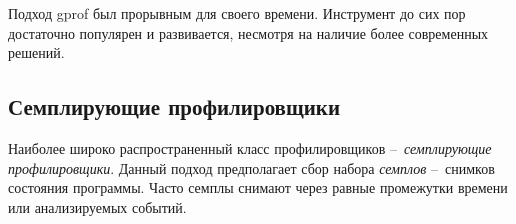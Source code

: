 Подход gprof был прорывным для своего времени.
Инструмент до сих пор достаточно популярен и развивается, несмотря на наличие более современных решений.



\subsection{Семплирующие профилировщики}
Наиболее широко распространенный класс профилировщиков – \textit{семплирующие профилировщики}.
Данный подход предполагает сбор набора \textit{семплов} – снимков состояния программы.
Часто семплы снимают через равные промежутки времени или анализируемых событий.

